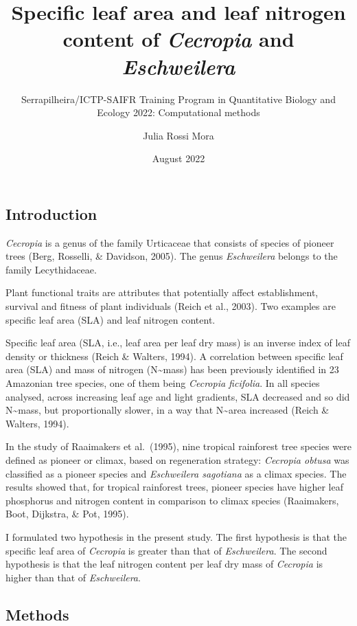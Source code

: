 \documentclass[
  10.5pt,
]{article}
\title{Specific leaf area and leaf nitrogen content of \emph{Cecropia}
and \emph{Eschweilera}}
\subtitle{Serrapilheira/ICTP-SAIFR Training Program in Quantitative
Biology and Ecology 2022: Computational methods}
\author{Julia Rossi Mora}
\date{August 2022}
\begin{document}
\maketitle

\hypertarget{introduction}{%
\subsection{Introduction}\label{introduction}}

\emph{Cecropia} is a genus of the family Urticaceae that consists of
species of pioneer trees (Berg, Rosselli, \& Davidson, 2005). The genus
\emph{Eschweilera} belongs to the family Lecythidaceae.

Plant functional traits are attributes that potentially affect
establishment, survival and fitness of plant individuals (Reich et al.,
2003). Two examples are specific leaf area (SLA) and leaf nitrogen
content.

Specific leaf area (SLA, i.e., leaf area per leaf dry mass) is an
inverse index of leaf density or thickness (Reich \& Walters, 1994). A
correlation between specific leaf area (SLA) and mass of nitrogen
(N\textasciitilde mass) has been previously identified in 23 Amazonian
tree species, one of them being \emph{Cecropia ficifolia}. In all
species analysed, across increasing leaf age and light gradients, SLA
decreased and so did N\textasciitilde mass, but proportionally slower,
in a way that N\textasciitilde area increased (Reich \& Walters, 1994).

In the study of Raaimakers et al.~(1995), nine tropical rainforest tree
species were defined as pioneer or climax, based on regeneration
strategy: \emph{Cecropia obtusa} was classified as a pioneer species and
\emph{Eschweilera sagotiana} as a climax species. The results showed
that, for tropical rainforest trees, pioneer species have higher leaf
phosphorus and nitrogen content in comparison to climax species
(Raaimakers, Boot, Dijkstra, \& Pot, 1995).

I formulated two hypothesis in the present study. The first hypothesis
is that the specific leaf area of \emph{Cecropia} is greater than that
of \emph{Eschweilera}. The second hypothesis is that the leaf nitrogen
content per leaf dry mass of \emph{Cecropia} is higher than that of
\emph{Eschweilera}.

\hypertarget{methods}{%
\subsection{Methods}\label{methods}}
\end{document}
